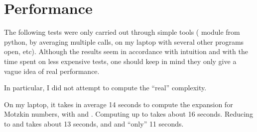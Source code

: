 \documentclass[../main.tex]{subfiles}
\begin{document}
\section{Performance}\label{section_implem_perf}


\begin{remark}
	The following tests were only carried out through simple tools ( module from python, by averaging multiple calls, on my laptop with several other programs open, etc). Although the results seem in accordance with intuition and with the time spent on less expensive tests, one should keep in mind they only give a vague idea of real performance.
	
	In particular, I did not attempt to compute the ``real'' complexity.
\end{remark}

On my laptop, it takes in average 14 seconds to compute the expansion for Motzkin numbers, with  and . Computing up to  takes about 16 seconds. Reducing to  and  takes about 13 seconds, and  and  ``only'' 11 seconds.
\end{document}
